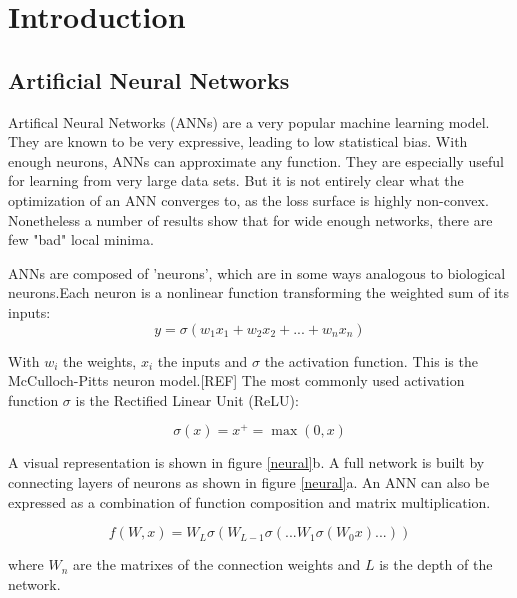\chapter{Introduction}
\section{Artificial Neural Networks}

Artifical Neural Networks (ANNs) are a very popular machine learning model. They are known to be very expressive, leading to low statistical bias. With enough neurons, ANNs can approximate any function.  They are especially useful for learning from very large data sets. But it is not entirely clear what the optimization of an ANN converges to, as the loss surface is highly non-convex. Nonetheless a number of results show that for wide enough networks, there are few "bad" local minima.

ANNs are composed of 'neurons', which are in some ways analogous to biological neurons.Each neuron is a nonlinear function transforming the weighted sum of its inputs:
\begin{equation*}
      y = \sigma(w_1x_1+w_2x_2+...+w_nx_n)
\end{equation*}

With $w_i$ the weights, $x_i$ the inputs and $\sigma$ the activation function. This is the McCulloch-Pitts neuron model.[REF] The most commonly used activation function $\sigma$ is the Rectified Linear Unit (ReLU):

\begin{equation*}
      \sigma(x) = x^+ = \max(0,x)
\end{equation*}

A visual representation is shown in figure \ref{neural}b. A full network is built by connecting layers of neurons as shown in figure \ref{neural}a. An ANN can also be expressed as a combination of function composition and matrix multiplication.

\begin{equation*}
         f(W,x) = W_L\sigma(W_{L-1}\sigma(...W_1\sigma(W_0x)...))
\end{equation*}

where $W_n$ are the matrixes of the connection weights and $L$ is the depth of the network. 





